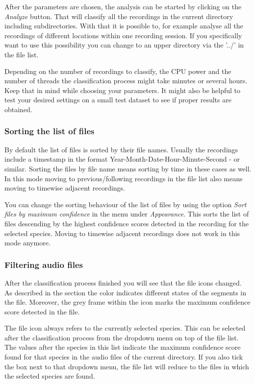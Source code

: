 \documentclass{scrartcl}
\begin{document}
After the parameters are chosen, the analysis can be started by clicking on the \textit{Analyze} button.
That will classify all the recordings in the current directory including subdirectories.
With that it is possible to, for example analyse all the recordings of different locations within one recording session.
If you specifically want to use this possibility you can change to an upper directory via the '../' in the file list.

Depending on the number of recordings to classify, the CPU power and the number of threads the classification process might take minutes or several hours.
Keep that in mind while choosing your parameters. 
It might also be helpful to test your desired settings on a small test dataset to see if proper results are obtained.

\subsubsection{Sorting the list of files} 
By default the list of files is sorted by their file names. 
Usually the recordings include a timestamp in the format Year-Month-Date-Hour-Minute-Second - or similar. 
Sorting the files by file name means sorting by time in these cases as well.
In this mode moving to previous/following recordings in the file list also means moving to timewise adjacent recordings.

You can change the sorting behaviour of the list of files by using the option \textit{Sort files by maximum confidence} in the menu under \textit{Appearance}.
This sorts the list of files descending by the highest confidence scores detected in the recording for the selected species. 
Moving to timewise adjacent recordings does not work in this mode anymore.

\subsubsection{Filtering audio files}\label{sec:FilterFileList}
After the classification process finished you will see that the file icons changed.
As described in the section  the color indicates different states of the segments in the file.
Moreover, the grey frame within the icon marks the maximum confidence score detected in the file.

The file icon always refers to the currently selected species. 
This can be selected after the classification process from the dropdown menu on top of the file list. 
The values after the species in this list indicate the maximum confidence score found for that species in the audio files of the current directory.
If you also tick the box next to that dropdown menu, the file list will reduce to the files in which the selected species are found. 
\end{document}
